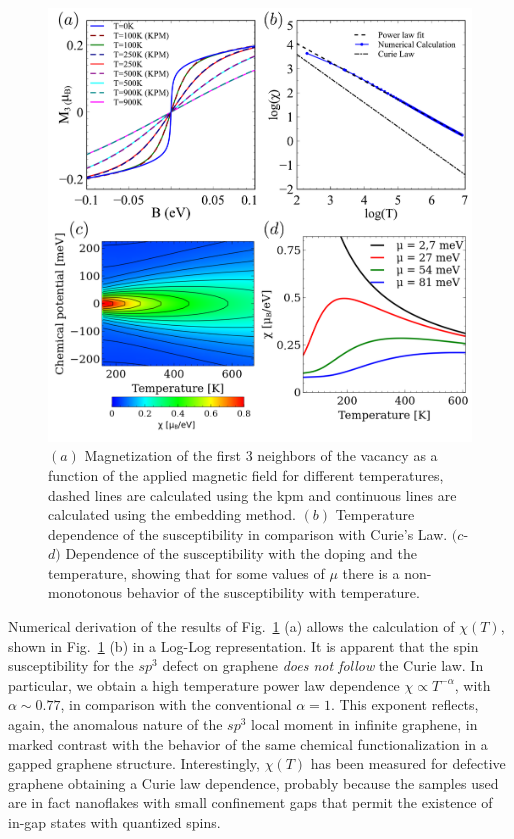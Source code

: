 \begin{figure}[t!]
  \centering
  \includegraphics{defects/fig/temp_sus.pdf}
  \caption{$(a)$ Magnetization of the first 3 neighbors of the vacancy as a
    function of the applied magnetic field for different temperatures, dashed lines are calculated using the \ac{kpm} and continuous lines are calculated using the embedding method. $(b)$ Temperature dependence of the susceptibility in comparison with Curie's Law. $(c$-$d)$ Dependence of the susceptibility with the doping and the temperature, showing that for some values of $\mu$ there is a non-monotonous behavior of the susceptibility with temperature.}
  \label{mag_temp}
\end{figure}


Numerical derivation of the results of  Fig.~\ref{mag_temp} (a) allows the calculation of $\chi(T)$, shown in Fig.~\ref{mag_temp} (b) in a Log-Log representation.
It is apparent that the spin susceptibility for the $sp^3$ defect on graphene
\emph{does not follow} the Curie law.
In particular, we obtain a high temperature power law dependence $\chi \propto T^{-\alpha}$, with $\alpha\sim0.77$, in comparison with the conventional $\alpha=1$.
This exponent reflects, again, the anomalous nature of the $sp^3$ local moment in infinite graphene, in marked contrast with the behavior of the same chemical functionalization in a gapped graphene structure.
Interestingly, $\chi(T)$ has been measured\cite{Nair2012} for defective graphene obtaining a Curie law dependence, probably because the samples used are in fact nanoflakes with small confinement gaps that permit the existence of in-gap states with quantized spins.

